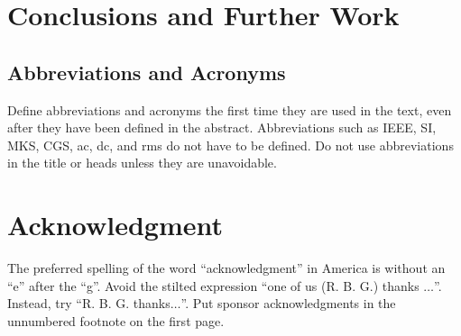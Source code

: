 \documentclass[conference]{IEEEtran}
\begin{document}
\section{Conclusions and Further Work}



\subsection{Abbreviations and Acronyms}\label{AA}
Define abbreviations and acronyms the first time they are used in the text, 
even after they have been defined in the abstract. Abbreviations such as 
IEEE, SI, MKS, CGS, ac, dc, and rms do not have to be defined. Do not use 
abbreviations in the title or heads unless they are unavoidable.







\section*{Acknowledgment}

The preferred spelling of the word ``acknowledgment'' in America is without 
an ``e'' after the ``g''. Avoid the stilted expression ``one of us (R. B. 
G.) thanks $\ldots$''. Instead, try ``R. B. G. thanks$\ldots$''. Put sponsor 
acknowledgments in the unnumbered footnote on the first page.
\end{document}
